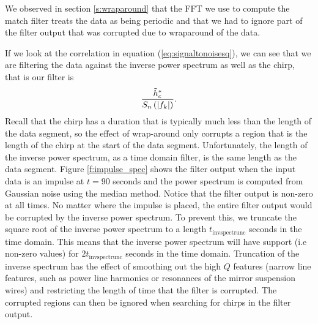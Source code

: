 We observed in section \ref{s:wraparound} that the FFT we use to compute the
match filter treats the data as being periodic and that we had to ignore part
of the filter output that was corrupted due to wraparound of the data.

If we look at the correlation in equation (\ref{eq:signaltonoisesq}), we can
see that we are filtering the data against the inverse power
spectrum as well as the chirp, that is our filter is
\begin{equation}
\frac{\tilde{h}_c^\ast}{S_n\left(\left|f_{k}\right|\right)}.
\end{equation}
Recall that the chirp has a duration that is typically much less than the
length of the data segment, so the effect of wrap-around only corrupts a
region that is the length of the chirp at the start of the data segment.
Unfortunately, the length of the inverse power spectrum, as a time domain
filter, is the same length as the data segment. Figure \ref{f:impulse_spec}
shows the filter output when the input data is an impulse at $t=90$ seconds
and the power spectrum is computed from Gaussian noise using the median
method. Notice that the filter output is non-zero at all times. No matter
where the impulse is placed, the entire filter output would be corrupted
by the inverse power spectrum.  To prevent this, we truncate the square
root of the inverse power spectrum to a length $t_\mathrm{invspectrunc}$
seconds in the time domain. This means that the inverse power spectrum will
have support (i.e non-zero values) for $2t_\mathrm{invspectrunc}$ seconds in
the time domain.  Truncation of the inverse spectrum has the effect of
smoothing out the high $Q$ features (narrow line features, such as power line
harmonics 
or resonances of the mirror suspension wires) and restricting the length
of time that the filter is corrupted. The corrupted regions can then be
ignored when searching for chirps in the filter output.

